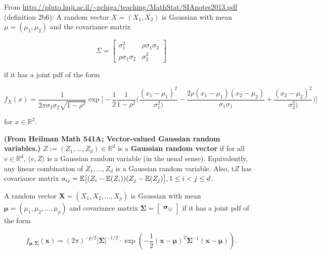 \begin{definition} From \url{http://pluto.huji.ac.il/~pchiga/teaching/MathStat/SIAnotes2013.pdf} (definition 2b6): A random vector \(X = (X_1, X_2)\) is Gaussian with mean \(\mu = (\mu_1, \mu_2)\) and the covariance matrix

\[
\Sigma = \begin{bmatrix}
   \sigma_1^2 & \rho \sigma_1 \sigma_2 \\
     \rho \sigma_1 \sigma_2     &\sigma_2^2
\end{bmatrix}
\]

if it has a joint pdf of the form

\[
f_X(x) = \frac{1}{2 \pi \sigma_2 \sigma_2 \sqrt{1 - \rho^2}} \exp \bigg[ - \frac{1}{2} \frac{1}{1 - \rho^2} \bigg( \frac{(x_1 - \mu_1)^2}{\sigma_1^2)} - \frac{2 \rho (x_1 - \mu_1)(x_2 - \mu_2)}{\sigma_1 \sigma_1} +  \frac{(x_2 - \mu_2)^2}{\sigma_2^2)} \bigg) \bigg]
\]

for \(x \in \mathbb{R}^2\).
\end{definition}

\begin{definition} \textbf{(From Heilman Math 541A; Vector-valued Gaussian random variables.)} \(Z:= (Z_1, \ldots, Z_d) \in \mathbb{R}^d\) is a \textbf{Gaussian random vector} if for all \(v \in \mathbb{R}^d\), \(\langle v, Z\rangle\) is a Gaussian random variable (in the usual sense). Equivalently, any linear combination of \(Z_1, \ldots, Z_d\) is a Gaussian random variable. Also, t\(Z\) has covariance matrix \(a_{ij} = \mathbb{E} \big[(Z_i - \mathbb{E}(Z_i)) (Z_j - \mathbb{E}(Z_j)\big], 1 \leq i < j \leq d\).

\end{definition}

\begin{definition} A random vector \(\boldsymbol{X} = (X_1, X_2, \ldots, X_p)\) is Gaussian with mean \(\boldsymbol{\mu} = (\mu_1, \mu_2, \ldots, \mu_p)\) and covariance matrix \(\boldsymbol{\Sigma} = \begin{bmatrix} \boldsymbol{\sigma}_{ij} \end{bmatrix}\) if it has a joint pdf of the form

\[
f_{\boldsymbol{\mu}, \boldsymbol{\Sigma}}(\boldsymbol{x}) = (2 \pi)^{-p/2} | \boldsymbol{\Sigma} |^{-1/2} \cdot \exp \left(- \frac{1}{2}(\boldsymbol{x} - \boldsymbol{\mu}) ^T  \boldsymbol{\Sigma}^{-1} (\boldsymbol{x} - \boldsymbol{\mu}) \right).
\]

\end{definition}

